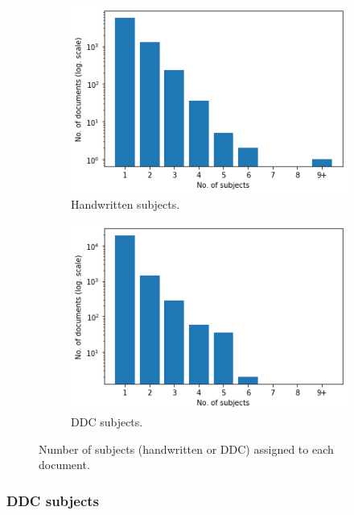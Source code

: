 \begin{figure}
  \begin{subfigure}[t]{0.45\textwidth}
    \centering
    \includegraphics[width=\textwidth]{figures/evaluation/subjects_per_doc.png}
    \caption{Handwritten subjects.}
    \label{fig:subjects_per_doc}
  \end{subfigure}
  \hfill
  \begin{subfigure}[t]{0.45\textwidth}
    \centering
    \includegraphics[width=\textwidth]{figures/evaluation/ddc_per_doc.png}
    \caption{DDC subjects.}
    \label{fig:ddc_per_doc}
  \end{subfigure}
  \caption{Number of subjects (handwritten or DDC) assigned to each document.}
\end{figure}

\subsubsection{DDC subjects} \label{eval_ddc}

